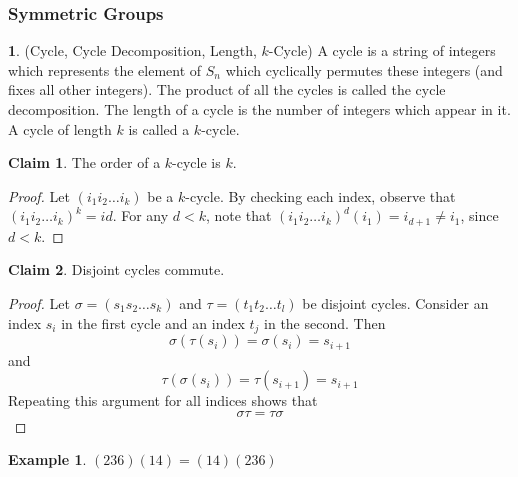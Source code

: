 \documentclass[12pt]{article}
\theoremstyle{definition}
\newtheorem{definition}{\color{NavyBlue}{\textbf{Definition}}}
\newtheorem{claim}{\color{JungleGreen}Claim}
\newtheorem{example}{\color{WildStrawberry}Example}
\theoremstyle{definition}
\begin{document}
\subsubsection{Symmetric Groups}
\begin{definition}(Cycle, Cycle Decomposition, Length, $k$-Cycle)
A cycle is a string of integers which represents the element of $S_n$ which cyclically permutes these integers (and fixes all other integers). The product of all the cycles is called the cycle decomposition. The length of a cycle is the number of integers which appear in it. A cycle of length $k$ is called a $k$-cycle. 
\end{definition}

\begin{claim}
The order of a $k$-cycle is $k$. 
\end{claim}
\begin{proof}
Let $(i_1 i_2 \ldots i_k)$ be a $k$-cycle. By checking each index, observe that $(i_1 i_2 \ldots i_k)^k = id$. For any $d < k$, note that $(i_1 i_2 \ldots i_k)^d (i_1) = i_{d+1} \neq i_1$, since $d < k$. 
\end{proof}

\begin{claim}
Disjoint cycles commute.
\end{claim}
\begin{proof}
Let $\sigma = (s_1 s_2 \ldots s_k)$ and $\tau = (t_1 t_2 \ldots t_l)$ be disjoint cycles. Consider an index $s_i$ in the first cycle and an index $t_j$ in the second. Then
\begin{equation}
\sigma(\tau(s_i)) = \sigma(s_i) = s_{i+1}
\end{equation}
and
\begin{equation}
\tau(\sigma(s_i)) = \tau(s_{i+1}) = s_{i+1}
\end{equation}
Repeating this argument for all indices shows that
\begin{equation}
\sigma \tau = \tau \sigma
\end{equation}
\end{proof}

\begin{example}
$(2 3 6) (1 4) = (1 4) (2 3 6)$
\end{example}
\end{document}

